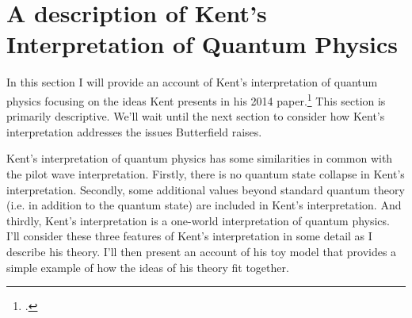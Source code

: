 
\section{A description of Kent's Interpretation of Quantum Physics}
In this section I will provide an account of Kent's interpretation of quantum physics focusing on the ideas Kent presents in his 2014 paper.\footnote{\cite{Kent2014}.} This section is primarily descriptive. We'll wait until the next section to consider how Kent's interpretation addresses the issues Butterfield raises.

Kent's interpretation of quantum physics has some similarities in common with the pilot wave interpretation. Firstly,  there is no quantum state collapse in Kent's interpretation. Secondly, some additional values beyond standard quantum theory (i.e. in addition to the quantum state) are included in Kent's interpretation. And thirdly, Kent's interpretation is a one-world interpretation of quantum physics. I'll consider these three features of Kent's interpretation in some detail as I describe his theory. I'll then present an account of his toy model that provides a simple example of how the ideas of his theory fit together. 


